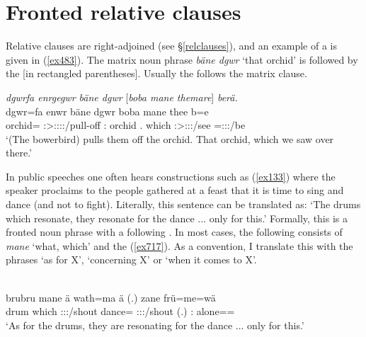 \section{Fronted relative clauses} \label{info-cleft}

Relative clauses are right-adjoined (see \S{}\ref{relclauses}), and an example of a  is given in (\ref{ex483}). The matrix noun phrase \emph{bäne dgwr} `that orchid' is followed by the  [in rectangled parentheses]. Usually the  follows the matrix clause.

\begin{exe}
	\ex \emph{dgwrfa enrgegwr bäne dgwr} [\emph{boba mane themare}] \emph{berä.}\\
	\gll dgwr=fa enwr bäne dgwr boba mane thee b=e\\
	orchid=\Abl{} \Stsg:\Sbj>\Stpl:\Obj:\Nonpast:\Ipfv:\Venit/pull-off \Dem:\Med{} orchid \Med.\Abl{} which  \Fpl:\Sbj>\Stpl:\Obj:\Rpst:\Pfv/see \Med=\Stpl:\Sbj:\Nonpast:\Ipfv/be\\
	\trans `(The bowerbird) pulls them off the orchid. That orchid, which we saw over there.'
	\label{ex483}
\end{exe}

In public speeches one often hears  constructions such as (\ref{ex133}) where the speaker proclaims to the people gathered at a feast that it is time to sing and dance (and not to fight). Literally, this sentence can be translated as: `The drums which resonate, they resonate for the dance ... only for this.' Formally, this is a fronted noun phrase with a following . In most cases, the following  consists of \emph{mane} `what, which' and the  (\ref{ex717}). As a convention, I translate this with the  phrases `as for X', `concerning X' or `when it comes to X'.

\begin{exe}
	\\
	\gll brubru mane ä wath=ma ä (.) zane frü=me=wä\\
	drum which \Stpl:\Sbj:\Nonpast:\Ipfv/shout dance=\Char{} \Stpl:\Sbj:\Nonpast:\Ipfv/shout (.) \Dem:\Prox{} alone=\Ins=\Emph\\
	\trans `As for the drums, they are resonating for the dance ... only for this.'\\
	\label{ex133}
\end{exe}

